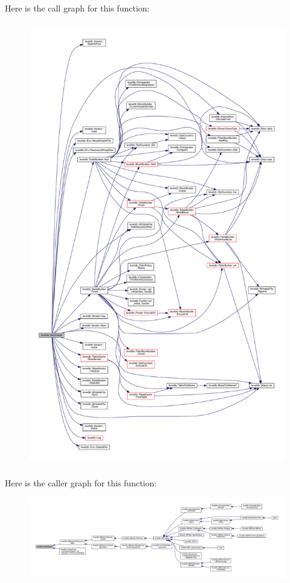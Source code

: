 Here is the call graph for this function\+:\nopagebreak
\begin{figure}[H]
\begin{center}
\leavevmode
\includegraphics[height=550pt]{namespaceleveldb_adadee87d30bdf48c72bcba5fa59102e2_cgraph}
\end{center}
\end{figure}




Here is the caller graph for this function\+:
\nopagebreak
\begin{figure}[H]
\begin{center}
\leavevmode
\includegraphics[width=350pt]{namespaceleveldb_adadee87d30bdf48c72bcba5fa59102e2_icgraph}
\end{center}
\end{figure}


